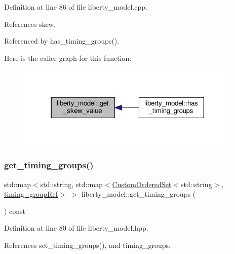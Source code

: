 Definition at line 86 of file liberty\+\_\+model.\+cpp.



References skew.



Referenced by has\+\_\+timing\+\_\+groups().

Here is the caller graph for this function\+:
\nopagebreak
\begin{figure}[H]
\begin{center}
\leavevmode
\includegraphics[width=306pt]{d0/dae/classliberty__model_a359f25f0b8be48227ebbd87f4727f1a2_icgraph}
\end{center}
\end{figure}
\mbox{\label{classliberty__model_ab261d605fb151cd7bafe4e4185a64e99}} 
\subsubsection{\texorpdfstring{get\+\_\+timing\+\_\+groups()}{get\_timing\_groups()}}
{\footnotesize\ttfamily std\+::map$<$std\+::string, std\+::map$<$\hyperlink{classCustomOrderedSet}{Custom\+Ordered\+Set}$<$std\+::string$>$, \hyperlink{timing__group_8hpp_a343803fe4e1a65fd6b57b504c2ed67ca}{timing\+\_\+group\+Ref}$>$ $>$ liberty\+\_\+model\+::get\+\_\+timing\+\_\+groups (\begin{DoxyParamCaption}{ }\end{DoxyParamCaption}) const\hspace{0.3cm}{\ttfamily [inline]}}



Definition at line 80 of file liberty\+\_\+model.\+hpp.



References set\+\_\+timing\+\_\+groups(), and timing\+\_\+groups.

